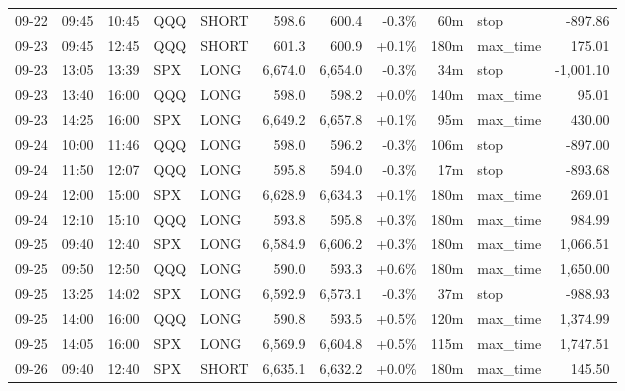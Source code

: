 \documentclass[11pt,a4paper,twoside]{article}
\begin{document}
\begin{center}
\begin{longtable}{>{\color{txtmain}}l l l l l r r r r >{\color{txtmain}}l r}
09-22 & 09:45 & 10:45 & QQQ & SHORT & 598.6 & 600.4 & \textcolor{lossred}{-0.3\%} & 60m & stop & \textcolor{lossred}{-897.86} \\
09-23 & 09:45 & 12:45 & QQQ & SHORT & 601.3 & 600.9 & \textcolor{wingreen}{+0.1\%} & 180m & max\_time & \textcolor{wingreen}{175.01} \\
09-23 & 13:05 & 13:39 & SPX & LONG & 6,674.0 & 6,654.0 & \textcolor{lossred}{-0.3\%} & 34m & stop & \textcolor{lossred}{-1,001.10} \\
09-23 & 13:40 & 16:00 & QQQ & LONG & 598.0 & 598.2 & \textcolor{wingreen}{+0.0\%} & 140m & max\_time & \textcolor{wingreen}{95.01} \\
09-23 & 14:25 & 16:00 & SPX & LONG & 6,649.2 & 6,657.8 & \textcolor{wingreen}{+0.1\%} & 95m & max\_time & \textcolor{wingreen}{430.00} \\
09-24 & 10:00 & 11:46 & QQQ & LONG & 598.0 & 596.2 & \textcolor{lossred}{-0.3\%} & 106m & stop & \textcolor{lossred}{-897.00} \\
09-24 & 11:50 & 12:07 & QQQ & LONG & 595.8 & 594.0 & \textcolor{lossred}{-0.3\%} & 17m & stop & \textcolor{lossred}{-893.68} \\
09-24 & 12:00 & 15:00 & SPX & LONG & 6,628.9 & 6,634.3 & \textcolor{wingreen}{+0.1\%} & 180m & max\_time & \textcolor{wingreen}{269.01} \\
09-24 & 12:10 & 15:10 & QQQ & LONG & 593.8 & 595.8 & \textcolor{wingreen}{+0.3\%} & 180m & max\_time & \textcolor{wingreen}{984.99} \\
09-25 & 09:40 & 12:40 & SPX & LONG & 6,584.9 & 6,606.2 & \textcolor{wingreen}{+0.3\%} & 180m & max\_time & \textcolor{wingreen}{1,066.51} \\
09-25 & 09:50 & 12:50 & QQQ & LONG & 590.0 & 593.3 & \textcolor{wingreen}{+0.6\%} & 180m & max\_time & \textcolor{wingreen}{1,650.00} \\
09-25 & 13:25 & 14:02 & SPX & LONG & 6,592.9 & 6,573.1 & \textcolor{lossred}{-0.3\%} & 37m & stop & \textcolor{lossred}{-988.93} \\
09-25 & 14:00 & 16:00 & QQQ & LONG & 590.8 & 593.5 & \textcolor{wingreen}{+0.5\%} & 120m & max\_time & \textcolor{wingreen}{1,374.99} \\
09-25 & 14:05 & 16:00 & SPX & LONG & 6,569.9 & 6,604.8 & \textcolor{wingreen}{+0.5\%} & 115m & max\_time & \textcolor{wingreen}{1,747.51} \\
09-26 & 09:40 & 12:40 & SPX & SHORT & 6,635.1 & 6,632.2 & \textcolor{wingreen}{+0.0\%} & 180m & max\_time & \textcolor{wingreen}{145.50} \\

\end{longtable}
\end{center}
\end{document}
